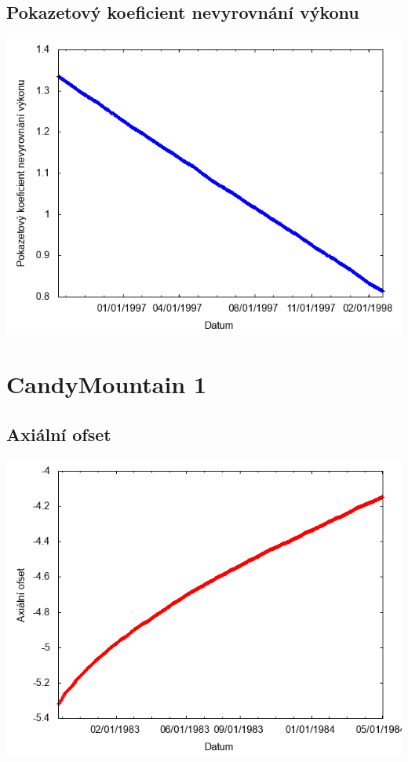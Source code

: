 \documentclass[a4paper,twoside,11pt]{article}
\begin{document}
\subsection*{Pokazetový koeficient nevyrovnání výkonu}
\begin{center}
\includegraphics[width=.8\textwidth]{graphs/Atlantis_17_fha.png}
\end{center}

\newpage
\section*{CandyMountain 1}
\subsection*{Axiální ofset}
\begin{center}
\includegraphics[width=.8\textwidth]{graphs/CandyMountain_01_ao.png}
\end{center}
\end{document}
